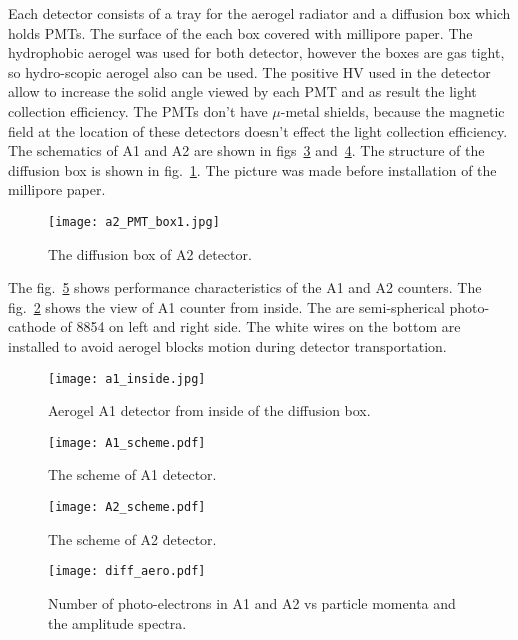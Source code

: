Each detector consists of a tray for the aerogel radiator and a diffusion box
which holds PMTs. The surface of the each box covered with millipore
paper. The hydrophobic aerogel was used for both detector, however the boxes
are gas tight, so hydro-scopic aerogel also can be used. The positive HV 
used in the detector allow to increase the solid angle viewed by each PMT
and as result the light collection efficiency. The PMTs don't have
$\mu$-metal shields, because the magnetic field at the location of these
detectors  doesn't effect the light collection efficiency.
The schematics of A1 and A2 are shown in figs~\ref{fig:A1_scheme} 
and~\ref{fig:A2_scheme}.
The structure of the diffusion box is shown in fig.~\ref{fig:A2_PMT}.
The picture was made before installation of the millipore paper.
%
\begin{figure}[p]
\texttt{[image: a2\_PMT\_box1.jpg]}
\caption[The diffusion box of A2 detector]
{The diffusion box of A2 detector.}
\label{fig:A2_PMT}
\end{figure}
%
The fig.~\ref{fig:diff_performance} shows performance characteristics 
of the A1 and A2 counters. 
%
The fig.~\ref{fig:A1_inside} shows the view of A1 counter from inside.
The are semi-spherical photo-cathode of 8854 on left and right side. 
The white wires on the bottom are installed to avoid aerogel blocks 
motion during detector transportation.
%
\begin{figure}[p]
\texttt{[image: a1\_inside.jpg]}
\caption[Aerogel A1 from inside of the detector ]
{Aerogel A1 detector from inside of the diffusion box. }
\label{fig:A1_inside}
\end{figure}
%
\begin{figure}[p]
\texttt{[image: A1\_scheme.pdf]}
\caption[The scheme of A1 detector] {The scheme of A1 detector.}
\label{fig:A1_scheme}
\end{figure}
%
\begin{figure}[p]
\texttt{[image: A2\_scheme.pdf]}
\caption[The scheme of A2 detector] {The scheme of A2 detector.}
\label{fig:A2_scheme}
\end{figure}
%
\begin{figure}[p]
\texttt{[image: diff\_aero.pdf]}
\caption[Number of photo-electrons in A1 and A2 vs particle momenta and 
the amplitude spectra]
{Number of photo-electrons in A1 and A2 vs particle momenta and 
the amplitude spectra.}
\label{fig:diff_performance}
\end{figure}


